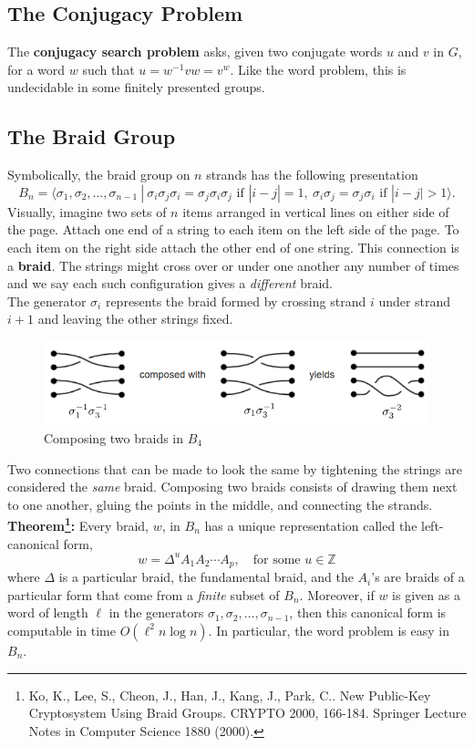 \documentclass[11pt]{article}
\newcommand{\integers}{\mathbb{Z}}
\begin{document}
\subsection*{The Conjugacy Problem}
The \textbf{conjugacy search problem} asks, given two conjugate words $u$ and $v$ in $G$, for a word $w$ such that $u = w^{-1}vw = v^w$. Like the word problem, this is undecidable in some finitely presented groups.

\subsection*{The Braid Group}
Symbolically, the braid group on $n$ strands has the following presentation
\[
B_n = \langle \sigma_1, \sigma_2, \ldots, \sigma_{n-1}\ |\  \sigma_i\sigma_j\sigma_i = \sigma_j\sigma_i\sigma_j\text{ if }|i-j| = 1,\ \sigma_i\sigma_j = \sigma_j\sigma_i\text{ if }|i-j|>1\rangle.
\]
Visually, imagine two sets of $n$ items arranged in vertical lines on either side of the page. Attach one end of a string to each item on the left side of the page. To each item on the right side attach the other end of one string. This connection is a \textbf{braid}. The strings might cross over or under one another any number of times and we say each such configuration gives a \textit{different} braid.\\
\indent The generator $\sigma_i$ represents the braid formed by crossing strand $i$ under strand $i+1$ and leaving the other strings fixed.
\begin{figure}[h]
\centering
	\includegraphics[scale=.61]{composition.PNG}
\caption{Composing two braids in $B_4$}
\end{figure}\pagebreak

\indent Two connections that can be made to look the same by tightening the strings are considered the \textit{same} braid. Composing two braids consists of drawing them next to one another, gluing the points in the middle, and connecting the strands.\\


\noindent \textbf{Theorem\footnote{Ko, K., Lee, S., Cheon, J., Han, J., Kang, J., Park, C.. New Public-Key Cryptosystem Using Braid Groups. CRYPTO 2000, 166-184. Springer Lecture Notes in Computer Science 1880 (2000).}: }Every braid, $w$, in $B_n$ has a unique representation called the left-canonical form,
\[
w = \Delta^uA_1A_2\cdots A_p,\quad \text{for some }u\in \integers
\]
where $\Delta$ is a particular braid, the fundamental braid, and the $A_i$'s are braids of a particular form that come from a \textit{finite} subset of $B_n$. Moreover, if $w$ is given as a word of length $\ell$ in the generators $\sigma_1, \sigma_2, \ldots, \sigma_{n-1}$, then this canonical form is computable in time $O(\ell^2n\log n)$. In particular, the word problem is easy in $B_n$.
\end{document}
